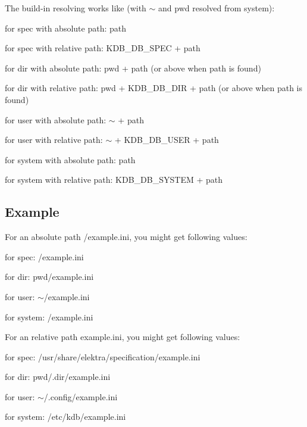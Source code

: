 The build-\/in resolving works like (with $\sim$ and {\ttfamily pwd} resolved from system)\+:


\begin{DoxyItemize}
\item for spec with absolute path\+: path
\item for spec with relative path\+: K\+D\+B\+\_\+\+D\+B\+\_\+\+S\+P\+E\+C + path
\item for dir with absolute path\+: {\ttfamily pwd} + path (or above when path is found)
\item for dir with relative path\+: {\ttfamily pwd} + K\+D\+B\+\_\+\+D\+B\+\_\+\+D\+I\+R + path (or above when path is found)
\item for user with absolute path\+: $\sim$ + path
\item for user with relative path\+: $\sim$ + K\+D\+B\+\_\+\+D\+B\+\_\+\+U\+S\+E\+R + path
\item for system with absolute path\+: path
\item for system with relative path\+: K\+D\+B\+\_\+\+D\+B\+\_\+\+S\+Y\+S\+T\+E\+M + path
\end{DoxyItemize}

\subsection*{Example}

For an absolute path /example.ini, you might get following values\+:


\begin{DoxyItemize}
\item for spec\+: /example.ini
\item for dir\+: {\ttfamily pwd}/example.ini
\item for user\+: $\sim$/example.ini
\item for system\+: /example.ini
\end{DoxyItemize}

For an relative path example.\+ini, you might get following values\+:


\begin{DoxyItemize}
\item for spec\+: /usr/share/elektra/specification/example.ini
\item for dir\+: {\ttfamily pwd}/.dir/example.\+ini
\item for user\+: $\sim$/.config/example.\+ini
\item for system\+: /etc/kdb/example.ini
\end{DoxyItemize}


